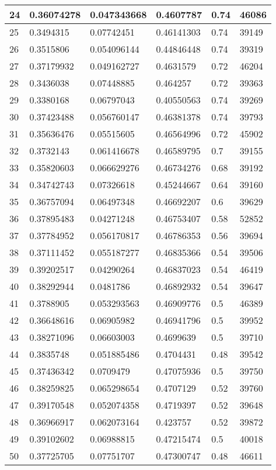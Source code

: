 \begin{longtable}{|l|l|l|l|l|l|}
24 & 0.36074278 & 0.047343668 & 0.4607787 & 0.74 & 46086 \\ \hline 
25 & 0.3494315 & 0.07742451 & 0.46141303 & 0.74 & 39149 \\ \hline 
26 & 0.3515806 & 0.054096144 & 0.44846448 & 0.74 & 39319 \\ \hline 
27 & 0.37179932 & 0.049162727 & 0.4631579 & 0.72 & 46204 \\ \hline 
28 & 0.3436038 & 0.07448885 & 0.464257 & 0.72 & 39363 \\ \hline 
29 & 0.3380168 & 0.06797043 & 0.40550563 & 0.74 & 39269 \\ \hline 
30 & 0.37423488 & 0.056760147 & 0.46381378 & 0.74 & 39793 \\ \hline 
31 & 0.35636476 & 0.05515605 & 0.46564996 & 0.72 & 45902 \\ \hline 
32 & 0.3732143 & 0.061416678 & 0.46589795 & 0.7 & 39155 \\ \hline 
33 & 0.35820603 & 0.066629276 & 0.46734276 & 0.68 & 39192 \\ \hline 
34 & 0.34742743 & 0.07326618 & 0.45244667 & 0.64 & 39160 \\ \hline 
35 & 0.36757094 & 0.06497348 & 0.46692207 & 0.6 & 39629 \\ \hline 
36 & 0.37895483 & 0.04271248 & 0.46753407 & 0.58 & 52852 \\ \hline 
37 & 0.37784952 & 0.056170817 & 0.46786353 & 0.56 & 39694 \\ \hline 
38 & 0.37111452 & 0.055187277 & 0.46835366 & 0.54 & 39506 \\ \hline 
39 & 0.39202517 & 0.04290264 & 0.46837023 & 0.54 & 46419 \\ \hline 
40 & 0.38292944 & 0.0481786 & 0.46892932 & 0.54 & 39647 \\ \hline 
41 & 0.3788905 & 0.053293563 & 0.46909776 & 0.5 & 46389 \\ \hline 
42 & 0.36648616 & 0.06905982 & 0.46941796 & 0.5 & 39952 \\ \hline 
43 & 0.38271096 & 0.06603003 & 0.4699639 & 0.5 & 39710 \\ \hline 
44 & 0.3835748 & 0.051885486 & 0.4704431 & 0.48 & 39542 \\ \hline 
45 & 0.37436342 & 0.0709479 & 0.47075936 & 0.5 & 39750 \\ \hline 
46 & 0.38259825 & 0.065298654 & 0.4707129 & 0.52 & 39760 \\ \hline 
47 & 0.39170548 & 0.052074358 & 0.4719397 & 0.52 & 39648 \\ \hline 
48 & 0.36966917 & 0.062073164 & 0.423757 & 0.52 & 39872 \\ \hline 
49 & 0.39102602 & 0.06988815 & 0.47215474 & 0.5 & 40018 \\ \hline 
50 & 0.37725705 & 0.07751707 & 0.47300747 & 0.48 & 46611 \\ \hline 
\end{longtable}